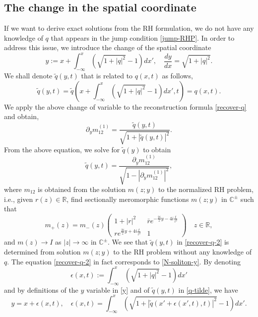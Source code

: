 \documentclass[11pt]{article}
\newcommand{\RR}{{\mathbb R}}
\newcommand{\CC}{{\mathbb C}}
\begin{document}
\subsection{The change in the spatial coordinate} 
If we want to derive exact solutions from the RH formulation, we do not have any knowledge of $q$ that appears in the jump condition \eqref{jump-RHP}. In order to address this issue, we introduce the change of the spatial coordinate 
\begin{equation}\label{y}
y:=x+\int_{-\infty}^x(\sqrt{1+|q|^2}-1)dx', \quad \frac{dy}{dx}=\sqrt{1+|q|^2}.
\end{equation}
We shall denote $\tilde{q}(y,t)$ that is related to $q(x,t)$ as follows, 
\begin{equation} \label{q-tilde}
\tilde{q}(y,t)=\tilde{q}\left(x+\int_{-\infty}^x(\sqrt{1+|q|^2}-1)dx',t\right)=q(x,t).
\end{equation}
We apply the above change of variable to the reconstruction formula \eqref{recover-q} and obtain,
$$\partial_ym_{12}^{(1)}=\frac{\tilde{q}(y,t)}{\sqrt{1+|\tilde{q}(y,t)|^2}}.$$
From the above equation, we solve for $\tilde{q}(y)$ to obtain
\begin{equation} \label{recover-q-2}
\tilde{q}(y,t)=\frac{\partial_ym_{12}^{(1)}}{\sqrt{1-\left|\partial_ym_{12}^{(1)}\right|^2}},
 \end{equation}
where $m_{12}$ is obtained from the solution $m(z;y)$ to the normalized RH problem, i.e., given $r(z) \in \RR$, find sectionally meromorphic functions $m(z;y)$ in $\CC^{\pm}$ such that 
\begin{equation} \label{RHP-jump-2}
 m_+(z)= m_-(z) \begin{pmatrix} 1+|r|^2 & \bar{r}e^{-\frac{2i}{z}y-4i\frac{t}{z^2}} \\
r e^{\frac{2i}{z}y+4i\frac{t}{z^2}} & 1 \end{pmatrix} \quad z\in \RR,
\end{equation}
and $m(z)\rightarrow I$ as $|z|\rightarrow \infty$ in $\CC^{\pm}$. We see that $\tilde{q}(y,t)$ in \eqref{recover-q-2} is determined from solution $m(z;y)$ to the RH problem without any knowledge of $q$. The equation \eqref{recover-q-2} in fact corresponds to \eqref{N-soliton-y}.
By denoting 
$$\epsilon(x,t):=\int_{-\infty}^x(\sqrt{1+|q|^2}-1)dx'$$
and 
by definitions of the $y$ variable in \eqref{y} and of $\tilde{q}(y,t)$ in \eqref{q-tilde}, we have 
\begin{equation} \label{eps-def}
y=x+\epsilon(x,t), \quad \epsilon(x,t)=\int_{-\infty}^x(\sqrt{1+|\tilde{q}(x'+\epsilon(x',t),t)|^2}-1)dx'.
\end{equation}
\end{document}
